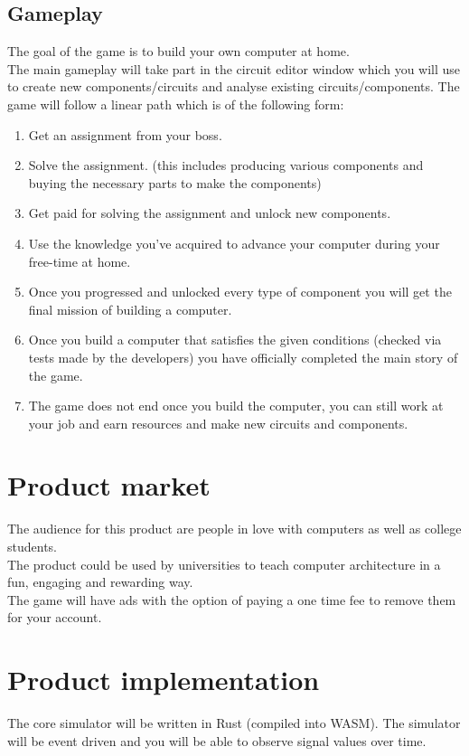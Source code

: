 \documentclass[12pt]{article}
\begin{document}
\subsection{Gameplay}
The goal of the game is to build your own computer at home.\\
The main gameplay will take part in the circuit editor window which you will use to create new components/circuits 
and analyse existing circuits/components.
The game will follow a linear path which is of the following form:
\begin{enumerate}
    \item Get an assignment from your boss.
    \item Solve the assignment. (this includes producing various components and buying the necessary parts to make the components)
    \item Get paid for solving the assignment and unlock new components.
    \item Use the knowledge you've acquired to advance your computer during your free-time at home.
    \pagebreak
    \item Once you progressed and unlocked every type of component you will get the final mission of building a computer.
    \item Once you build a computer that satisfies the given conditions (checked via tests made by the developers) you have officially completed the main story of the game.
    \item The game does not end once you build the computer, you can still work at your job and earn resources and make new circuits and components.
\end{enumerate}



\section{Product market}
The audience for this product are people in love with computers as well as college students.\\
The product could be used by universities to teach computer architecture in a fun, engaging and rewarding way.\\
The game will have ads with the option of paying a one time fee to remove them for your account.
\section{Product implementation}

The core simulator will be written in Rust (compiled into WASM).
The simulator will be event driven and you will be able to observe signal values over time.
\end{document}
